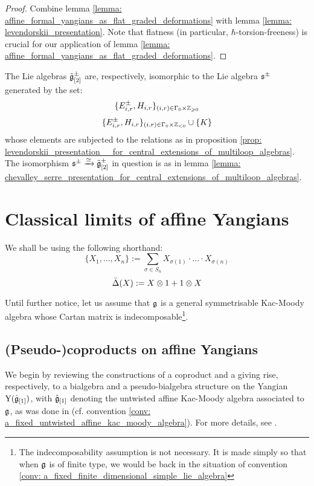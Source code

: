             \begin{proof}
                Combine lemma \ref{lemma: affine_formal_yangians_as_flat_graded_deformations} with lemma \ref{lemma: levendorskii_presentation}. Note that flatness (in particular, $\hbar$-torsion-freeness) is crucial for our application of lemma \ref{lemma: affine_formal_yangians_as_flat_graded_deformations}.
            \end{proof}
        \begin{corollary} \label{coro: levendorskii_presentation__for_central_extensions_of_multiloop_algebras}
            The Lie algebras $\tilde{\mathfrak{g}}_{[2]}^{\pm}$ are, respectively, isomorphic to the Lie algebra $\mathfrak{s}^{\pm}$ generated by the set:
                $$\{ E_{i, r}^{\pm}, H_{i, r} \}_{(i, r) \in \Gamma_0 \x \Z_{\geq 0}}$$
                $$\{ E_{i, r}^{\pm}, H_{i, r} \}_{(i, r) \in \Gamma_0 \x \Z_{< 0}} \cup \{K\}$$
            whose elements are subjected to the relations as in proposition \ref{prop: levendorskii_presentation__for_central_extensions_of_multiloop_algebras}. The isomorphism $\mathfrak{s}^{\pm} \xrightarrow[]{\simeq} \tilde{\mathfrak{g}}_{[2]}^{\pm}$ in question is as in lemma \ref{lemma: chevalley_serre_presentation_for_central_extensions_of_multiloop_algebras}.
        \end{corollary}

    \section{Classical limits of affine Yangians}
        \begin{convention}
            We shall be using the following shorthand:
                $$\{ X_1, ..., X_n \} := \sum_{\sigma \in S_n} X_{\sigma(1)} \cdot ... \cdot X_{\sigma(n)}$$
                $$\bar{\Delta}(X) := X \tensor 1 + 1 \tensor X$$
        \end{convention}

        \begin{convention} \label{conv: general_symmetrisable_kac_moody_algebra}
            Until further notice, let us assume that $\mathfrak{g}$ is a general symmetrisable Kac-Moody algebra whose Cartan matrix is indecomposable\footnote{The indecomposability assumption is not necessary. It is made simply so that when $\mathfrak{g}$ is of finite type, we would be back in the situation of convention \ref{conv: a_fixed_finite_dimensional_simple_lie_algebra}}.
        \end{convention}

        \subsection{(Pseudo-)coproducts on affine Yangians}
            We begin by reviewing the constructions of a coproduct and a  giving rise, respectively, to a bialgebra and a pseudo-bialgebra structure on the Yangian $\mathrm{Y}(\hat{\mathfrak{g}}_{[1]})$, with $\hat{\mathfrak{g}}_{[1]}$ denoting the untwisted affine Kac-Moody algebra associated to $\mathfrak{g}$, as was done in \cite[Chapter 7]{kac_infinite_dimensional_lie_algebras} (cf. convention \ref{conv: a_fixed_untwisted_affine_kac_moody_algebra}). For more details, see \cite[Sections 4, 5, and 6]{guay_nakajima_wendlandt_affine_yangian_coproduct}.

